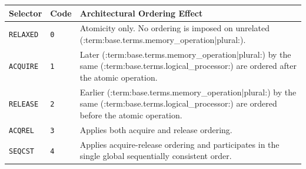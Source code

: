 \Needspace{1.25in}
\begingroup\footnotesize
\setlength{\aboverulesep}{0pt}
\setlength{\belowrulesep}{0pt}
\setlength{\extrarowheight}{1.2pt}
\begin{center}
\begin{tabularx}{\linewidth}{@{}>{\raggedright\arraybackslash}p{0.95in}>{\raggedright\arraybackslash}p{0.45in}>{\raggedright\arraybackslash}X@{}}
\toprule
\rowcolor{BedrockHeaderFill}
\textbf{Selector} & \textbf{Code} & \textbf{Architectural Ordering Effect}\\
\midrule
\texttt{RELAXED} & \texttt{0} & Atomicity only. No ordering is imposed on unrelated (:term:base.terms.memory_operation|plural:).\\
\texttt{ACQUIRE} & \texttt{1} & Later (:term:base.terms.memory_operation|plural:) by the same (:term:base.terms.logical_processor:) are ordered after the atomic operation.\\
\texttt{RELEASE} & \texttt{2} & Earlier (:term:base.terms.memory_operation|plural:) by the same (:term:base.terms.logical_processor:) are ordered before the atomic operation.\\
\texttt{ACQREL} & \texttt{3} & Applies both acquire and release ordering.\\
\texttt{SEQCST} & \texttt{4} & Applies acquire-release ordering and participates in the single global sequentially consistent order.\\
\bottomrule
\end{tabularx}
\end{center}
\endgroup
